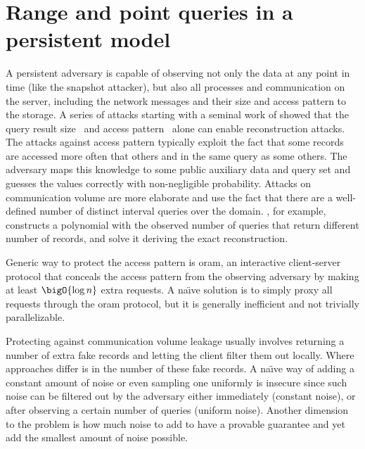 \chapter{Range and point queries in a persistent model}\label{section:range-queries-persistent}
\thispagestyle{myheadings}

	A persistent adversary is capable of observing not only the data at any point in time (like the snapshot attacker), but also all processes and communication on the server, including the network messages and their size and access pattern to the storage.
	A series of attacks starting with a seminal work of \textcite{generic-attacks-kellaris} showed that the query result size~\cite{generic-attacks-kellaris, state-of-uniform, attacks-improved-reconstruction, pump-volume-attacks, volume-range-attacks} and access pattern~\cite{multidimensional-range-queries, inference-attack-islam-14, leakage-abuse-attacks-cash-15, inference-attacks-naveed-15, generic-attacks-kellaris, attacks-tao-of-inference, grubbs-attacks, access-pattern-disclosure, attacks-improved-reconstruction} alone can enable reconstruction attacks.
	The attacks against access pattern typically exploit the fact that some records are accessed more often that others and in the same query as some others.
	The adversary maps this knowledge to some public auxiliary data and query set and guesses the values correctly with non-negligible probability.
	Attacks on communication volume are more elaborate and use the fact that there are a well-defined number of distinct interval queries over the domain.
	\cite{generic-attacks-kellaris}, for example, constructs a polynomial with the observed number of queries that return different number of records, and solve it deriving the exact reconstruction.

	Generic way to protect the access pattern is \gls{oram}, an interactive client-server protocol that conceals the access pattern from the observing adversary by making at least $\bigO{\log n}$ extra requests.
	A na\"{\i}ve solution is to simply proxy all requests through the \gls{oram} protocol, but it is generally inefficient and not trivially parallelizable.

	Protecting against communication volume leakage usually involves returning a number of extra fake records and letting the client filter them out locally.
	Where approaches differ is in the number of these fake records.
	A na\"{\i}ve way of adding a constant amount of noise or even sampling one uniformly is insecure since such noise can be filtered out by the adversary either immediately (constant noise), or after observing a certain number of queries (uniform noise).
	Another dimension to the problem is how much noise to add to have a provable guarantee and yet add the smallest amount of noise possible.

